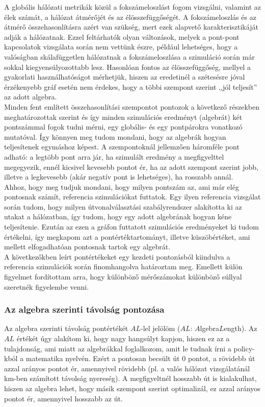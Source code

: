     A globális hálózati metrikák közül a fokszámeloszlást fogom vizsgálni, valamint az élek számát, a hálózat átmérőjét és az élösszefüggőségét. A fokszámeloszlás és az átmérő összehasonlításra azért van szükség, mert ezek alapvető karakterisztikáját adják a hálózatnak. Ezzel feltárhatók olyan változások, melyek a pont-pont kapcsolatok vizsgálata során nem vettünk észre, például lehetséges, hogy a valóságban skálafüggetlen hálózatnak a fokszámeloszlása a szimuláció során már sokkal kiegyensúlyozottabb lesz. Hasonlóan fontos az élösszefüggőség, mellyel a gyakorlati használhatóságot mérhetjük, hiszen az eredetinél a szétesésre jóval érzékenyebb gráf esetén nem érdekes, hogy a többi szempont szerint ,,jól teljesít'' az adott algebra.\\

    Minden fent említett összehasonlítási szempontot pontozok a következő részekben meghatározottak szerint és így minden szimulációs eredményt (algebrát) két pontszámmal fogok tudni mérni, egy globális- és egy pontpárokra vonatkozó mutatóval. Így könnyen meg tudom mondani, hogy az algebrák hogyan teljesítenek egymáshoz képest. A szempontoknál jellemzően háromféle pont adható: a legtöbb pont arra jár, ha szimulált eredmény a megfigyelttel megegyezik, ennél kicsivel kevesebb pontot ér, ha az adott szempont szerint jobb, illetve a legkevesebb (akár negatív pont is lehetséges), ha rosszabb annál.\\

    Ahhoz, hogy meg tudjuk mondani, hogy milyen pontszám az, ami már elég pontosnak számít, referencia szimulációkat futtatok. Egy ilyen referencia vizsgálat során tudom, hogy milyen útvonalválasztási szabályrendszer alakította ki az utakat a hálózatban, így tudom, hogy egy adott algebrának hogyan kéne teljesítenie. Ezután az ezen a gráfon futtatott szimulációs eredményeket ki tudom értékelni, így megkapom azt a pontértéktartományt, illetve küszöbértéket, ami mellett elfogadhatóan pontosnak tartok egy algebrát.\\
    A következőkben leírt pontértékeket egy kezdeti pontozásból kiindulva a referencia szimulációk során finomhangolva határoztam meg. Emellett külön figyelmet fordítottam arra, hogy különböző mérőszámokat különböző súllyal szeretnék figyelembe venni.

    \subsubsection{Az algebra szerinti távolság pontozása}
    Az algebra szerinti távolság pontértékét $AL$-lel jelölöm ($AL$: $A$lgebra$L$ength). Az $AL$ értékét úgy alakítom ki, hogy nagy hangsúlyt kapjon, hiszen ez az a tulajdonság, ami miatt az algebrákkal foglalkozom, amit le tudnak írni a policy-kból a matematika nyelvén. Ezért a pontosan becsült út 0 pontot, a rövidebb út azzal arányos pontot ér, amennyivel rövidebb (pl. a valós hálózat vizsgálatánál km-ben számított távolság nyereség). A megfigyeltnél hosszabb út is kialakulhat, hiszen az algebra lehet, hogy másik szempont szerint optimalizál, ez azzal arányos pontot ér, amennyivel hosszabb az út.

